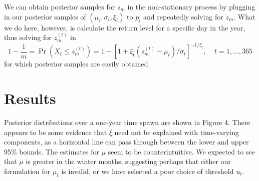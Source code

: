 \documentclass[12pt]{article}
\begin{document}
\noindent We can obtain posterior samples for $z_m$ in the non-stationary process by plugging in our posterior samples of $(\mu_i,\sigma_i,\xi_i)$ to $p_i$ and repeatedly solving for $z_m$. What we do here, however, is calculate the return level for a specific day in the year, thus solving for $z_m^{(t)}$ in
\[ 1 - \frac{1}{m} = \Pr(X_t \leq z_m^{(t)}) = 1 - [1 + \xi_t(z_m^{(t)}-\mu_t)/\sigma_t]^{-1/\xi_t},~~~~~t=1,\ldots,365 \]
\noindent for which posterior samples are easily obtained.

\section*{Results}

\noindent Posterior distributions over a one-year time spawn are shown in Figure 4. There appears to be some evidence that $\xi$ need not be explained with time-varying components, as a horizontal line can pass through between the lower and upper 95\% bounds. The estimates for $\mu$ seem to be counterintuitive. We expected to see that $\mu$ is greater in the winter months, suggesting perhaps that either our formulation for $\mu_t$ is invalid, or we have selected a poor choice of threshold $u_t$.
\end{document}
